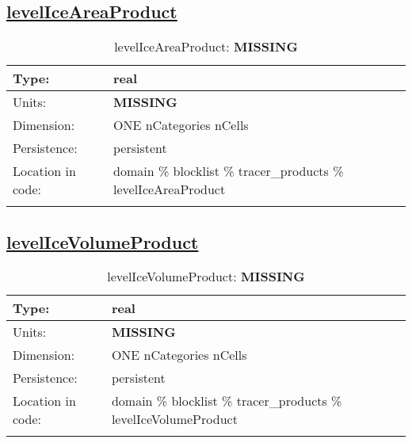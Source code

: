 \subsection[levelIceAreaProduct]{\hyperref[sec:var_tab_tracer_products]{levelIceAreaProduct}}
\label{subsec:var_sec_tracer_products_levelIceAreaProduct}
\begin{center}
\begin{longtable}{| p{2.0in} | p{4.0in} |}
        \hline 
        Type: & real \\
        \hline 
        Units: & {\bf \color{red} MISSING} \\
        \hline 
        Dimension: & ONE nCategories nCells \\
        \hline 
        Persistence: & persistent \\
        \hline 
         Location in code: & domain \% blocklist \% tracer\_products \% levelIceAreaProduct \\
         \hline 
    \caption{levelIceAreaProduct: {\bf \color{red} MISSING}}
\end{longtable}
\end{center}
\subsection[levelIceVolumeProduct]{\hyperref[sec:var_tab_tracer_products]{levelIceVolumeProduct}}
\label{subsec:var_sec_tracer_products_levelIceVolumeProduct}
\begin{center}
\begin{longtable}{| p{2.0in} | p{4.0in} |}
        \hline 
        Type: & real \\
        \hline 
        Units: & {\bf \color{red} MISSING} \\
        \hline 
        Dimension: & ONE nCategories nCells \\
        \hline 
        Persistence: & persistent \\
        \hline 
         Location in code: & domain \% blocklist \% tracer\_products \% levelIceVolumeProduct \\
         \hline 
    \caption{levelIceVolumeProduct: {\bf \color{red} MISSING}}
\end{longtable}
\end{center}

